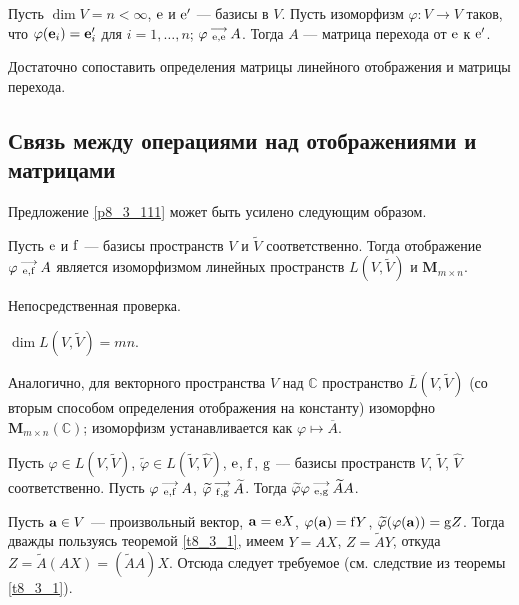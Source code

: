 

\begin{predl}\label{p8_3_112}
Пусть $\dim V=n<\infty$, $\mathrm{e}$ и $\mathrm{e}'$ --- базисы в $V$.
Пусть изоморфизм $\varphi: V\to V$ таков, что $\varphi (\mathbf{e}_i) = \mathbf{e}'_i$ для $i=1, \ldots, n$;
$\varphi \begin{smallmatrix} \longrightarrow \\ \mathrm{e}, \mathrm{e} \end{smallmatrix} A$. Тогда $A$ --- матрица перехода от $\mathrm{e}$ к $\mathrm{e}'$.
\end{predl}
\dok Достаточно сопоставить определения матрицы линейного отображения и матрицы перехода.
\edok




\subsection{Связь между операциями над отображениями и матрицами}

Предложение \ref{p8_3_111} может быть усилено следующим образом.

\begin{theor}\label{p8_3_333}
Пусть $\mathrm{e}$ и $\mathrm{f}$ --- базисы  пространств $V$ и $\widetilde{V}$ соответственно.
Тогда отображение $\varphi \begin{smallmatrix} \longrightarrow \\ \mathrm{e}, \mathrm{f} \end{smallmatrix} A$ является изоморфизмом
линейных пространств $L(V, \widetilde{V})$ и $\mathbf{M}_{m\times n}$.\\
\end{theor}
\dok Непосредственная проверка.
\edok

\begin{sled}
$\dim L(V, \widetilde{V}) = mn$.
\end{sled}

\otstup

Аналогично, для векторного пространства $V$ над $\mathbb{C}$ 
пространство $\overline{L}(V, \widetilde{V})$ (со вторым способом определения отображения на константу)
изоморфно $\mathbf{M}_{m\times n}(\mathbb{C})$; изоморфизм устанавливается как
$\varphi \mapsto \overline{A}$.


\begin{predl}\label{p8_3_4}
Пусть $\varphi \in L(V, \widetilde{V})$, $\widetilde{\varphi} \in
L(\widetilde{V}, \widehat{V})$, $\mathrm{e}$, $\mathrm{f}$, $\mathrm{g}$ 
--- базисы  пространств $V$, $\widetilde{V}$, $\widehat{V}$ соответственно.
Пусть $\varphi \begin{smallmatrix} \longrightarrow \\ \mathrm{e}, \mathrm{f} \end{smallmatrix} A$,
 $\widetilde{\varphi} \begin{smallmatrix} \longrightarrow \\ \mathrm{f}, \mathrm{g} \end{smallmatrix} \widetilde{A}$.
Тогда $ \widetilde{\varphi} \varphi \begin{smallmatrix} \longrightarrow \\ \mathrm{e}, \mathrm{g} \end{smallmatrix} \widetilde{A} A$.
\end{predl}
\dok Пусть $\mathbf{a}\in V$ --- произвольный вектор, $\mathbf{a} = \mathrm{e}X$, 
$\varphi(\mathbf{a}) = \mathrm{f}Y$, $\widetilde{\varphi}(\varphi(\mathbf{a})) = \mathrm{g}Z$.
 Тогда дважды пользуясь теоремой \ref{t8_3_1}, имеем
$Y=AX$, $Z=\widetilde{A}Y$, откуда $Z= \widetilde{A}(AX)=(\widetilde{A}A)X$.
Отсюда следует требуемое
(см. следствие из теоремы \ref{t8_3_1}).
\edok

